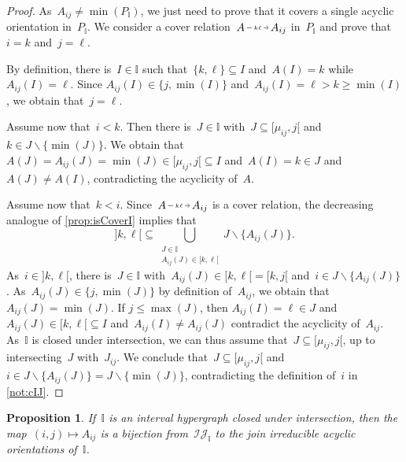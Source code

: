 \documentclass{amsart}
\newtheorem{proposition}[theorem]{Proposition}
\theoremstyle{definition}
\newcommand{\cal}[1]{\mathcal{#1}} %
\newcommand{\ssm}{\smallsetminus} %
\newcommand{\II}{\mathbb I} %
\newcommand{\cIJ}{\cal{IJ}} %
\newcommand{\flip}[4]{\ensuremath{#1 \, \begin{tikzpicture}[scale=1,baseline=-.1cm] \path[->]  (0,0) edge node[fill=white,inner sep=2pt, font=\tiny ] {$#2#3$} (.7,0); \end{tikzpicture} \, #4}}
\begin{document}
\begin{proof}
As~$A_{ij} \ne \min(P_\II)$, we just need to prove that it covers a single acyclic orientation in~$P_\II$.
We consider a cover relation~\flip{A}{k}{\ell}{A_{ij}} in~$P_\II$ and prove that~$i = k$ and~$j = \ell$.

By definition, there is~$I \in \II$ such that~$\{k,\ell\} \subseteq I$ and~$A(I) = k$ while~$A_{ij}(I) = \ell$.
Since $A_{ij}(I) \in \{j, \min(I)\}$ and~$A_{ij}(I) = \ell > k \ge \min(I)$, we obtain that~$j = \ell$.

Assume now that~$i < k$.
Then there is~$J \in \II$ with~$J \subseteq [\mu_{ij}, j[$ and~$k \in J \ssm \{\min(J)\}$.
We obtain that~$A(J) = A_{ij}(J) = \min(J) \in [\mu_{ij}, j[ \subseteq I$ and~$A(I) = k \in J$ and~$A(J) \ne A(I)$, contradicting the acyclicity of~$A$.

Assume now that~$k < i$.
Since~$\flip{A}{k}{\ell}{A_{ij}}$ is a cover relation, the decreasing analogue of \cref{prop:isCoverI} implies that
\[
{]k,\ell[} \subseteq \bigcup_{\substack{J \in \II \\ A_{ij}(J) \in [k,\ell[}} J \ssm \{A_{ij}(J)\}. %
\]
As~$i \in {]k,\ell[}$, there is~$J \in \II$ with~$A_{ij}(J) \in {[k,\ell[} = {[k,j[}$ and~$i \in J \ssm \{A_{ij}(J)\}$.
As~${A_{ij}(J) \in \{j, \min(J)\}}$ by definition of~$A_{ij}$, we obtain that~$A_{ij}(J) = \min(J)$.
If $j \le \max(J)$, then $A_{ij}(I) = \ell \in J$ and~$A_{ij}(J) \in {[k,\ell[} \subseteq I$ and~$A_{ij}(I) \ne A_{ij}(J)$ contradict the acyclicity of~$A_{ij}$.
As~$\II$ is closed under intersection, we can thus assume that~$J \subseteq [\mu_{ij}, j[$, up to intersecting~$J$ with~$J_{ij}$.
We conclude that~$J \subseteq [\mu_{ij}, j[$ and~$i \in J \ssm \{A_{ij}(J)\} = J \ssm \{\min(J)\}$, contradicting the definition of~$i$ in \cref{not:cIJ}.
\end{proof}

\begin{proposition}
\label{prop:joinIrreducibles}
If~$\II$ is an interval hypergraph closed under intersection, then the map~${(i,j) \mapsto A_{ij}}$ is a bijection from~$\cIJ_\II$ to the join irreducible acyclic orientations of~$\II$.
\end{proposition}
\end{document}
